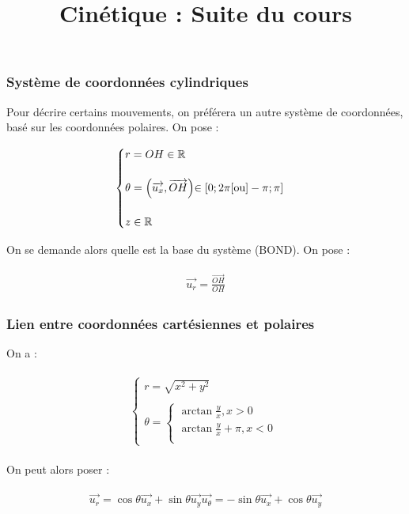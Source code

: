 \documentclass{article}
\title{Cinétique : Suite du cours}
\date{}
\begin{document}
\subsubsection{Système de coordonnées cylindriques}


Pour décrire certains mouvements, on préférera un autre système de coordonnées, basé sur les coordonnées polaires. On pose :

\begin{align*}\begin{split}
\begin{cases}
    r = OH\in\mathbb{R}\\\\
    \theta = \Bigl(\overrightarrow{u_x},\overrightarrow{OH}\Bigl)\in[0;2\pi[ \text{ou} ]-\pi;\pi]\\\\
    z\in\mathbb{R}
\end{cases}
\end{split}\end{align*}

On se demande alors quelle est la base du système (BOND). On pose :

\begin{align*}\begin{split}
\overrightarrow{u_r}=\frac{\overrightarrow{OH}}{OH}
\end{split}\end{align*}

\bigskip
\bigskip

\subsubsection*{Lien entre coordonnées cartésiennes et polaires}

On a :

\begin{align*}\begin{split}
\begin{cases}
    r=\sqrt{x^2+y^2}\\\\
    \theta=\begin{cases}
        \arctan\frac{y}{x},x>0\\
        \arctan\frac{y}{x}+\pi,x<0\\
    \end{cases}
\end{cases}
\end{split}\end{align*}

On peut alors poser :

\begin{align*}\begin{split}
\overrightarrow{u_r}=\cos\theta\overrightarrow{u_x}+\sin\theta\overrightarrow{u_y}
\overrightarrow{u_\theta}=-\sin\theta\overrightarrow{u_x}+\cos\theta\overrightarrow{u_y}
\end{split}\end{align*}
\end{document}
